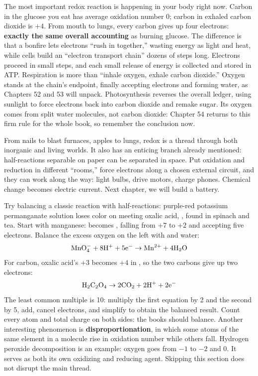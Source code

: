 The most important redox reaction is happening in your body right now. Carbon in the glucose you eat has average oxidation number 0; carbon in exhaled carbon dioxide is $+4$. From mouth to lungs, every carbon gives up four electrons: \textbf{exactly the same overall accounting} as burning glucose. The difference is that a bonfire lets electrons ``rush in together,'' wasting energy as light and heat, while cells build an ``electron transport chain'' dozens of steps long. Electrons proceed in small steps, and each small release of energy is collected and stored in ATP. Respiration is more than ``inhale oxygen, exhale carbon dioxide.'' Oxygen stands at the chain's endpoint, finally accepting electrons and forming water, as Chapters 52 and 53 will unpack. Photosynthesis reverses the overall ledger, using sunlight to force electrons back into carbon dioxide and remake sugar. Its oxygen comes from split water molecules, not carbon dioxide: Chapter 54 returns to this firm rule for the whole book, so remember the conclusion now.

From nails to blast furnaces, apples to lungs, redox is a thread through both inorganic and living worlds. It also has an enticing branch already mentioned: half-reactions separable on paper can be separated in space. Put oxidation and reduction in different ``rooms,'' force electrons along a chosen external circuit, and they can work along the way: light bulbs, drive motors, charge phones. Chemical change becomes electric current. Next chapter, we will build a battery.

\begin{tiaozhan}
Try balancing a classic reaction with half-reactions: purple-red potassium permanganate solution loses color on meeting oxalic acid, , found in spinach and tea. Start with manganese:  becomes , falling from $+7$ to $+2$ and accepting five electrons. Balance the excess oxygen on the left with  and water:
\[\mathrm{MnO_4^-} + \mathrm{8H^+} + \mathrm{5e^-} \rightarrow \mathrm{Mn^{2+}} + \mathrm{4H_2O}\]
For carbon, oxalic acid's $+3$ becomes $+4$ in , so the two carbons give up two electrons:
\[\mathrm{H_2C_2O_4} \rightarrow \mathrm{2CO_2} + \mathrm{2H^+} + \mathrm{2e^-}\]
The least common multiple is 10: multiply the first equation by 2 and the second by 5, add, cancel electrons, and simplify to obtain the balanced result. Count every atom and total charge on both sides: the books should balance. Another interesting phenomenon is \textbf{disproportionation}, in which some atoms of the same element in a molecule rise in oxidation number while others fall. Hydrogen peroxide decomposition is an example: oxygen goes from $-1$ to $-2$ and 0. It serves as both its own oxidizing and reducing agent. Skipping this section does not disrupt the main thread.
\end{tiaozhan}


